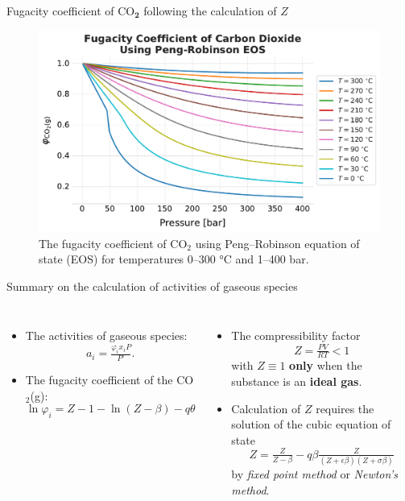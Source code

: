 \begin{frame}{Fugacity coefficient of CO$_{\boldsymbol{2}}$ following the calculation of $Z$}

\begin{figure}
\begin{centering}
\includegraphics[height=0.8\textheight]{figures/activity-models/fugacity-coefficient-co2-peng-robinson}
\par\end{centering}
\caption{The fugacity coefficient of CO$_{2}$ using Peng--Robinson equation
of state (EOS) for temperatures 0–300 °C and 1–400 bar. }
\end{figure}

\end{frame}
%
%
\begin{frame}{Summary on the calculation of activities of gaseous species}
\begin{columns}[t]

\begin{itemize}[<+->]
\item  The \alert{activities of gaseous species}:
\[
a_{i}=\tfrac{\varphi_{i}x_{i}P}{P^{\circ}}.
\]
\item The \alert{fugacity coefficient} of the CO$_{2}$(g):
\[
\ln\varphi_{i}=Z-1-\ln(Z-\beta)-q\theta
\]
\end{itemize}

\begin{itemize}[<+->]
\item  The \alert{compressibility factor} 
\[
Z=\tfrac{PV}{RT} < 1
\]
with $Z\equiv1$ \textbf{only} when the substance is an \textbf{ideal gas}.
%
\item Calculation of $Z$ requires the solution of the \alert{cubic equation of state}
\[
Z=\tfrac{Z}{Z-\beta}-q\beta\tfrac{Z}{(Z+\epsilon\beta)(Z+\sigma\beta)}
\]
by \emph{fixed point method} or \emph{Newton's method}.
\end{itemize}
\end{columns}

\end{frame}
%
